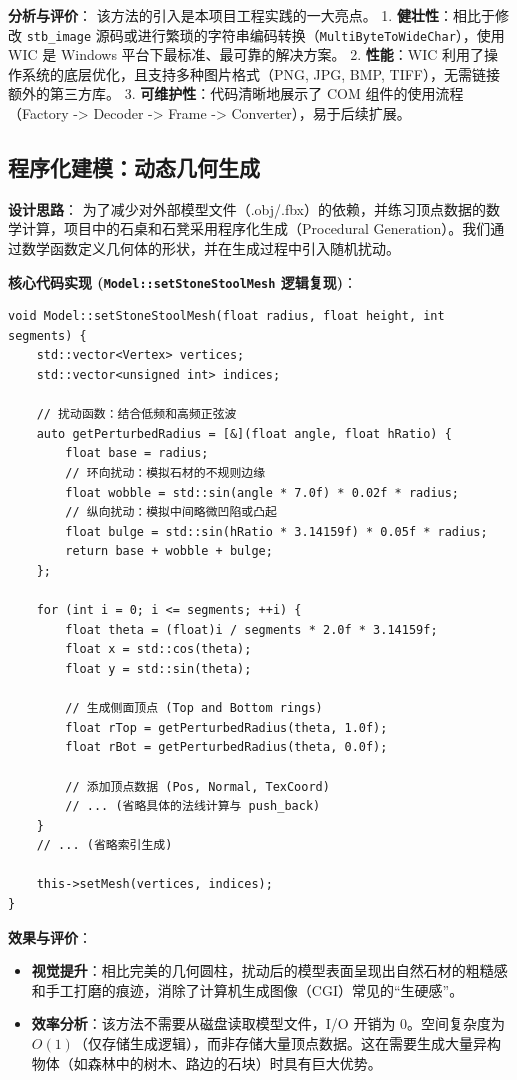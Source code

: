 \documentclass[a4paper]{article}
\begin{document}
\textbf{分析与评价}：
该方法的引入是本项目工程实践的一大亮点。
1.  \textbf{健壮性}：相比于修改 \texttt{stb\_image} 源码或进行繁琐的字符串编码转换（\texttt{MultiByteToWideChar}），使用 WIC 是 Windows 平台下最标准、最可靠的解决方案。
2.  \textbf{性能}：WIC 利用了操作系统的底层优化，且支持多种图片格式（PNG, JPG, BMP, TIFF），无需链接额外的第三方库。
3.  \textbf{可维护性}：代码清晰地展示了 COM 组件的使用流程（Factory -> Decoder -> Frame -> Converter），易于后续扩展。

\subsection{程序化建模：动态几何生成}

\textbf{设计思路}：
为了减少对外部模型文件（.obj/.fbx）的依赖，并练习顶点数据的数学计算，项目中的石桌和石凳采用程序化生成（Procedural Generation）。我们通过数学函数定义几何体的形状，并在生成过程中引入随机扰动。

\textbf{核心代码实现 (\texttt{Model::setStoneStoolMesh} 逻辑复现)}：

\begin{lstlisting}[caption={程序化生成带扰动的圆柱体网格}]
void Model::setStoneStoolMesh(float radius, float height, int segments) {
    std::vector<Vertex> vertices;
    std::vector<unsigned int> indices;
    
    // 扰动函数：结合低频和高频正弦波
    auto getPerturbedRadius = [&](float angle, float hRatio) {
        float base = radius;
        // 环向扰动：模拟石材的不规则边缘
        float wobble = std::sin(angle * 7.0f) * 0.02f * radius; 
        // 纵向扰动：模拟中间略微凹陷或凸起
        float bulge = std::sin(hRatio * 3.14159f) * 0.05f * radius;
        return base + wobble + bulge;
    };

    for (int i = 0; i <= segments; ++i) {
        float theta = (float)i / segments * 2.0f * 3.14159f;
        float x = std::cos(theta);
        float y = std::sin(theta);

        // 生成侧面顶点 (Top and Bottom rings)
        float rTop = getPerturbedRadius(theta, 1.0f);
        float rBot = getPerturbedRadius(theta, 0.0f);
        
        // 添加顶点数据 (Pos, Normal, TexCoord)
        // ... (省略具体的法线计算与 push_back)
    }
    // ... (省略索引生成)
    
    this->setMesh(vertices, indices);
}
\end{lstlisting}

\textbf{效果与评价}：
\begin{itemize}
    \item \textbf{视觉提升}：相比完美的几何圆柱，扰动后的模型表面呈现出自然石材的粗糙感和手工打磨的痕迹，消除了计算机生成图像（CGI）常见的“生硬感”。
    \item \textbf{效率分析}：该方法不需要从磁盘读取模型文件，I/O 开销为 0。空间复杂度为 $O(1)$（仅存储生成逻辑），而非存储大量顶点数据。这在需要生成大量异构物体（如森林中的树木、路边的石块）时具有巨大优势。
\end{itemize}
\end{document}

